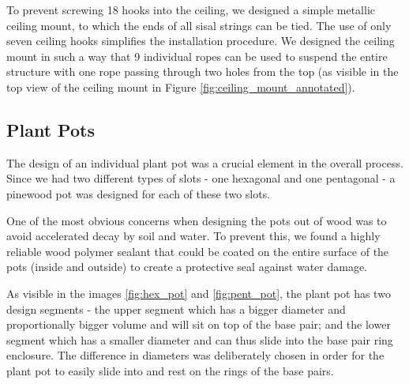\documentclass[12pt]{extarticle} %
\begin{document}
To prevent screwing 18 hooks into the ceiling, we designed a simple metallic ceiling mount, to which the ends of all sisal strings can be tied. The use of only seven ceiling hooks simplifies the installation procedure. We designed the ceiling mount in such a way that 9 individual ropes can be used to suspend the entire structure with one rope passing through two holes from the top (as visible in the top view of the ceiling mount in Figure \ref{fig:ceiling_mount_annotated}). 

\pagebreak
\subsection{Plant Pots}
The design of an individual plant pot was a crucial element in the overall process. Since we had two different types of slots - one hexagonal and one pentagonal - a pinewood pot was designed for each of these two slots.

One of the most obvious concerns when designing the pots out of wood was to avoid accelerated decay by soil and water. To prevent this, we found a highly reliable wood polymer sealant that could be coated on the entire surface of the pots (inside and outside) to create a protective seal against water damage.

As visible in the images \ref{fig:hex_pot} and \ref{fig:pent_pot}, the plant pot has two design segments - the upper segment which has a bigger diameter and proportionally bigger volume and will sit on top of the base pair; and the lower segment which has a smaller diameter and can thus slide into the base pair ring enclosure. The difference in diameters was deliberately chosen in order for the plant pot to easily slide into and rest on the rings of the base pairs. 
\end{document}
